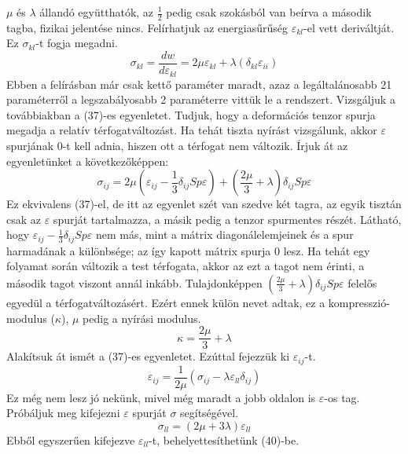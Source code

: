 \documentclass[a4paper,12pt]{article}
\begin{document}
$\mu$ és $\lambda$ állandó együtthatók, az $\frac{1}{2}$ pedig csak szokásból van beírva a második tagba, fizikai jelentése nincs.
Felírhatjuk az energiasűrűség $\varepsilon_{kl}$-el vett deriváltját. Ez $\sigma_{kl}$-t fogja megadni.
\begin{equation}
\sigma_{kl}=\frac{d w}{d\varepsilon_{kl}}=2\mu\varepsilon_{kl}+\lambda(\delta_{kl}\varepsilon_{ii})
\end{equation} 
Ebben a felírásban már csak kettő paraméter maradt, azaz a legáltalánosabb 21 paraméterről a legszabályosabb 2 paraméterre vittük le a rendszert.
Vizsgáljuk a továbbiakban a (37)-es egyenletet. Tudjuk, hogy a deformációs tenzor spurja megadja a relatív térfogatváltozást. Ha tehát tiszta nyírást vizsgálunk, akkor $\varepsilon$ spurjának 0-t kell adnia, hiszen ott a térfogat nem változik. Írjuk át az egyenletünket a következőképpen:
\begin{equation}
\sigma_{ij}=2\mu(\varepsilon_{ij}-\frac{1}{3}\delta_{ij}Sp\varepsilon)+(\frac{2\mu}{3}+\lambda)\delta_{ij}Sp\varepsilon
\end{equation}
Ez ekvivalens (37)-el, de itt az egyenlet szét van szedve két tagra, az egyik tisztán csak az $\varepsilon$ spurját tartalmazza, a másik pedig a tenzor spurmentes részét. Látható, hogy $\varepsilon_{ij}-\frac{1}{3}\delta_{ij}Sp\varepsilon$ nem más, mint a mátrix diagonálelemjeinek és a spur harmadának a különbsége; az így kapott mátrix spurja 0 lesz. Ha tehát egy folyamat során változik a test térfogata, akkor az ezt a tagot nem érinti, a második tagot viszont annál inkább. Tulajdonképpen $(\frac{2\mu}{3}+\lambda)\delta_{ij}Sp\varepsilon$ felelős egyedül a térfogatváltozásért. Ezért ennek külön nevet adtak, ez a kompresszió-modulus ($\kappa$), $\mu$ pedig a nyírási modulus.
\begin{equation}
\kappa=\frac{2\mu}{3}+\lambda
\end{equation}
Alakítsuk át ismét a (37)-es egyenletet. Ezúttal fejezzük ki $\varepsilon_{ij}$-t.
\begin{equation}
\varepsilon_{ij}=\frac{1}{2\mu}(\sigma_{ij}-\lambda\varepsilon_{ll}\delta_{ij})
\end{equation}
Ez még nem lesz jó nekünk, mivel még maradt a jobb oldalon is $\varepsilon$-os tag. Próbáljuk meg kifejezni $\varepsilon$ spurját $\sigma$ segítségével.
\begin{equation}
\sigma_{ll}=(2\mu+3\lambda)\varepsilon_{ll}
\end{equation}
Ebből egyszerűen kifejezve $\varepsilon_{ll}$-t, behelyettesíthetünk (40)-be.
\end{document}
